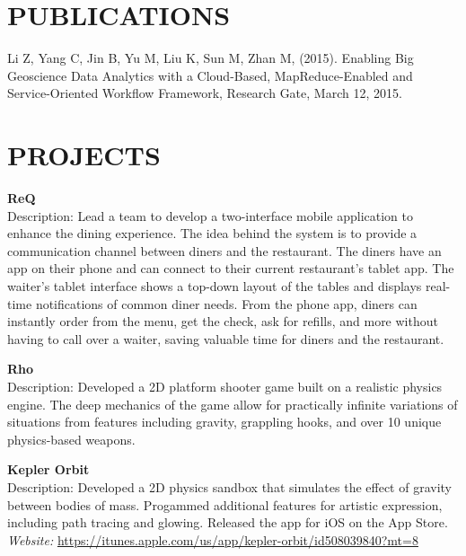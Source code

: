 \documentclass[line,margin]{res}
\begin{document}
\begin{resume}
                 \section{PUBLICATIONS}
                 Li Z, Yang C, Jin B, Yu M, Liu K, Sun M, Zhan M, (2015). Enabling Big Geoscience Data Analytics with a Cloud-Based, MapReduce-Enabled and Service-Oriented Workflow Framework, Research Gate, March 12, 2015.

                 \section{PROJECTS}
                         \textbf {ReQ} \\                 
                         Description: Lead a team to develop a two-interface mobile application to enhance the dining experience. The idea behind the system is to provide a communication channel between diners and the restaurant. The diners have an app on their phone and can connect to their current restaurant's tablet app. The waiter's tablet interface shows a top-down layout of the tables and displays real-time notifications of common diner needs. From the phone app, diners can instantly order from the menu, get the check, ask for refills, and more without having to call over a waiter, saving valuable time for diners and the restaurant.

                         \textbf{Rho} \\
                         Description: Developed a 2D platform shooter game built on a realistic physics engine. The deep mechanics of the game allow for practically infinite variations of situations from features including gravity, grappling hooks, and over 10 unique physics-based weapons.

                         \textbf{Kepler Orbit} \\
                         Description: Developed a 2D physics sandbox that simulates the effect of gravity between bodies of mass. Progammed additional features for artistic expression, including path tracing and glowing. Released the app for iOS on the App Store. \\
                         \textit{Website: } \url{https://itunes.apple.com/us/app/kepler-orbit/id508039840?mt=8}
                         

\end{resume}
\end{document}
